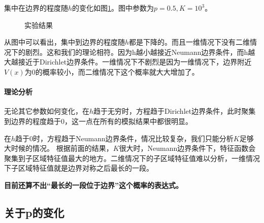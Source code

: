 \documentclass[12pt,a4paper]{article}
\begin{document}
集中在边界的程度随$h$的变化如图\ref{fh}。图中参数为$p=0.5, K=10^3$。
\begin{figure}[h]
\centering
{}
\caption{实验结果}
\label{fh}
\end{figure}

从图中可以看出，集中到边界的程度随$h$都是下降的。而且一维情况下没有二维情况下的剧烈。这和我们的理论相符。因为h越小越接近Neumann边界条件，而h越大越接近于Dirichlet边界条件。一维情况下不剧烈是因为一维情况下，边界附近$V(x)$为0的概率较小，而二维情况下这个概率就大大增加了。

\paragraph{理论分析}

无论其它参数如何变化，在$h$趋于无穷时，方程趋于Dirichlet边界条件，此时聚集到边界的程度趋于0，这一点在所有的模拟结果中都很明显。

在$h$趋于0时，方程趋于Neumann边界条件，情况比较复杂，我们只能分析$K$足够大时候的情况。
根据前面的结果，$K$很大时，Neumann边界条件下，特征函数会聚集到子区域特征值最大的地方。二维情况下的子区域特征值难以分析，一维情况下子区域特征值就是边界对称之后最长的一段。

\textbf{\color{blue} 目前还算不出“最长的一段位于边界”这个概率的表达式。}

\subsection{关于p的变化}
\end{document}

